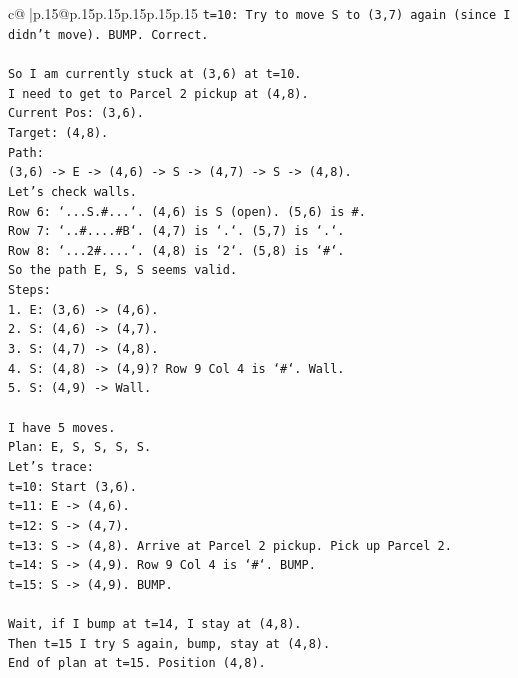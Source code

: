 \documentclass{article}
\begin{document}
{\begin{supertabular}{c@{$\;$}|p{.15\linewidth}@{}p{.15\linewidth}p{.15\linewidth}p{.15\linewidth}p{.15\linewidth}p{.15\linewidth}}
{{{\texttt{t=10: Try to move S to (3,7) again (since I didn't move). BUMP. Correct.} \\
\\ 
\texttt{So I am currently stuck at (3,6) at t=10.} \\
\texttt{I need to get to Parcel 2 pickup at (4,8).} \\
\texttt{Current Pos: (3,6).} \\
\texttt{Target: (4,8).} \\
\texttt{Path:} \\
\texttt{(3,6) {-}> E {-}> (4,6) {-}> S {-}> (4,7) {-}> S {-}> (4,8).} \\
\texttt{Let's check walls.} \\
\texttt{Row 6: `...S.\#...`. (4,6) is S (open). (5,6) is \#.} \\
\texttt{Row 7: `..\#....\#B`. (4,7) is `.`. (5,7) is `.`.} \\
\texttt{Row 8: `...2\#....`. (4,8) is `2`. (5,8) is `\#`.} \\
\texttt{So the path E, S, S seems valid.} \\
\texttt{Steps:} \\
\texttt{1. E: (3,6) {-}> (4,6).} \\
\texttt{2. S: (4,6) {-}> (4,7).} \\
\texttt{3. S: (4,7) {-}> (4,8).} \\
\texttt{4. S: (4,8) {-}> (4,9)? Row 9 Col 4 is `\#`. Wall.} \\
\texttt{5. S: (4,9) {-}> Wall.} \\
\\ 
\texttt{I have 5 moves.} \\
\texttt{Plan: E, S, S, S, S.} \\
\texttt{Let's trace:} \\
\texttt{t=10: Start (3,6).} \\
\texttt{t=11: E {-}> (4,6).} \\
\texttt{t=12: S {-}> (4,7).} \\
\texttt{t=13: S {-}> (4,8). Arrive at Parcel 2 pickup. Pick up Parcel 2.} \\
\texttt{t=14: S {-}> (4,9). Row 9 Col 4 is `\#`. BUMP.} \\
\texttt{t=15: S {-}> (4,9). BUMP.} \\
\\ 
\texttt{Wait, if I bump at t=14, I stay at (4,8).} \\
\texttt{Then t=15 I try S again, bump, stay at (4,8).} \\
\texttt{End of plan at t=15. Position (4,8).} \\
}}}
\end{supertabular}}
\end{document}
